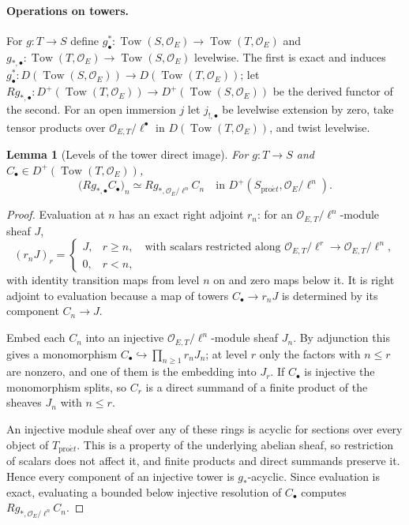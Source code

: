 \documentclass[11pt,a4paper]{article}
\numberwithin{equation}{section}
\newtheorem{lemma}[theorem]{Lemma}
\theoremstyle{definition}
\theoremstyle{remark}
\newcommand{\proet}{\mathrm{pro}\acute{e}t}
\begin{document}
\paragraph{Operations on towers.}
For $g:T\to S$ define
$g_\bullet^*\colon\operatorname{Tow}(S,\mathcal O_E)\to\operatorname{Tow}(T,\mathcal O_E)$
and
$g_{*,\bullet}\colon\operatorname{Tow}(T,\mathcal O_E)\to\operatorname{Tow}(S,\mathcal O_E)$
levelwise. The first is exact and induces
$g_\bullet^*\colon D(\operatorname{Tow}(S,\mathcal O_E))\to D(\operatorname{Tow}(T,\mathcal O_E))$;
let
$Rg_{*,\bullet}\colon D^+(\operatorname{Tow}(T,\mathcal O_E))\to D^+(\operatorname{Tow}(S,\mathcal O_E))$
be the derived functor of the second. For an open immersion $j$ let
$j_{!,\bullet}$ be levelwise extension by zero, take tensor products
over $\mathcal O_{E,T}/\ell^\bullet$ in $D(\operatorname{Tow}(T,\mathcal O_E))$,
and twist levelwise.

\begin{lemma}[Levels of the tower direct image]
\label{lem:sp-tower-levels}
For $g:T\to S$ and $C_\bullet\in D^+(\operatorname{Tow}(T,\mathcal O_E))$,
\[
 \bigl(Rg_{*,\bullet}C_\bullet\bigr)_n\simeq Rg_{*,\mathcal O_E/\ell^n}C_n
 \quad\text{in }D^+(S_{\proet},\mathcal O_E/\ell^n).
\]
\end{lemma}
\begin{proof}
Evaluation at $n$ has an exact right adjoint $r_n$: for an
$\mathcal O_{E,T}/\ell^n$-module sheaf $J$,
\[
 (r_nJ)_r=\begin{cases}
 J,&r\geq n,\quad\text{with scalars restricted along }
     \mathcal O_{E,T}/\ell^r\to\mathcal O_{E,T}/\ell^n,\\
 0,&r<n,
 \end{cases}
\]
with identity transition maps from level $n$ on and zero maps below it.
It is right adjoint to evaluation because a map of towers
$C_\bullet\to r_nJ$ is determined by its component $C_n\to J$.

Embed each $C_n$ into an injective $\mathcal O_{E,T}/\ell^n$-module
sheaf $J_n$. By
adjunction this gives a monomorphism
$C_\bullet\hookrightarrow\prod_{n\geq1}r_nJ_n$; at level $r$ only the
factors with $n\leq r$ are nonzero, and one of them is the embedding into
$J_r$. If $C_\bullet$ is injective the monomorphism splits, so $C_r$ is a
direct summand of a finite product of the sheaves $J_n$ with $n\leq r$.

An injective module sheaf over any of these rings is acyclic for
sections over every object of $T_{\proet}$. This is a property of the
underlying abelian sheaf, so restriction of scalars does not affect it,
and finite products and direct summands preserve it. Hence every
component of an injective tower is $g_*$-acyclic. Since evaluation is
exact, evaluating a bounded below injective resolution of $C_\bullet$
computes $Rg_{*,\mathcal O_E/\ell^n}C_n$.
\end{proof}
\end{document}
